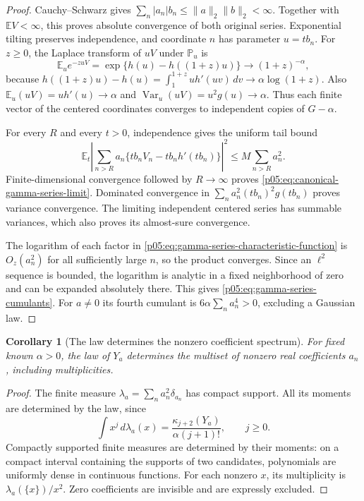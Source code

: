\documentclass[11pt,letterpaper]{article}
\newtheorem{corollary}[theorem]{Corollary}
\theoremstyle{definition}
\theoremstyle{remark}
\newcommand{\1}{\mathbf 1}
\begin{document}
\begin{proof}
Cauchy--Schwarz gives
$\sum_n|a_n|b_n\le\|a\|_2\|b\|_2<\infty$.
Together with $\mathbb EV<\infty$, this proves absolute convergence
of both original series.  Exponential tilting preserves independence,
and coordinate $n$ has parameter $u=tb_n$.
For $z\ge0$, the Laplace transform of $uV$ under $\mathbb P_u$ is
\[
 \mathbb E_u e^{-zuV}
 =\exp\{h(u)-h((1+z)u)\}
 \longrightarrow(1+z)^{-\alpha},
\]
because
$h((1+z)u)-h(u)=\int_1^{1+z}uh'(uv)\,dv
\to\alpha\log(1+z)$.
Also $\mathbb E_u(uV)=uh'(u)\to\alpha$ and
$\operatorname{Var}_u(uV)=u^2g(u)\to\alpha$.
Thus each finite vector of the centered coordinates converges to
independent copies of $G-\alpha$.

For every $R$ and every $t>0$, independence gives the uniform tail bound
\begin{equation}\label{p05:eq:gamma-series-uniform-tail}
 \mathbb E_t\left|
 \sum_{n>R}a_n\{tb_nV_n-tb_nh'(tb_n)\}\right|^2
 \le M\sum_{n>R}a_n^2.
\end{equation}
Finite-dimensional convergence followed by $R\to\infty$ proves
\eqref{p05:eq:canonical-gamma-series-limit}.  Dominated convergence in
$\sum_n a_n^2(tb_n)^2g(tb_n)$ proves variance convergence.
The limiting independent centered series has summable variances,
which also proves its almost-sure convergence.

The logarithm of each factor in
\eqref{p05:eq:gamma-series-characteristic-function} is $O_z(a_n^2)$
for all sufficiently large $n$, so the product converges.  Since an
$\ell^2$ sequence is bounded, the logarithm is analytic in a fixed
neighborhood of zero and can be expanded absolutely there.  This
gives \eqref{p05:eq:gamma-series-cumulants}.  For $a\ne0$ its fourth
cumulant is $6\alpha\sum_n a_n^4>0$, excluding a Gaussian law.
\end{proof}

\begin{corollary}[The law determines the nonzero coefficient spectrum]
\label{p05:cor:fluctuation-spectral-recovery}
For fixed known $\alpha>0$, the law of $Y_a$ determines the multiset
of nonzero real coefficients $a_n$, including multiplicities.
\end{corollary}

\begin{proof}
The finite measure $\lambda_a=\sum_n a_n^2\delta_{a_n}$ has compact
support.  All its moments are determined by the law, since
\[
 \int x^j\,d\lambda_a(x)
 =\frac{\kappa_{j+2}(Y_a)}{\alpha(j+1)!},\qquad j\ge0.
\]
Compactly supported finite measures are determined by their moments:
on a compact interval containing the supports of two candidates,
polynomials are uniformly dense in continuous functions.  For each
nonzero $x$, its multiplicity is $\lambda_a(\{x\})/x^2$.
Zero coefficients are invisible and are expressly excluded.
\end{proof}
\end{document}
